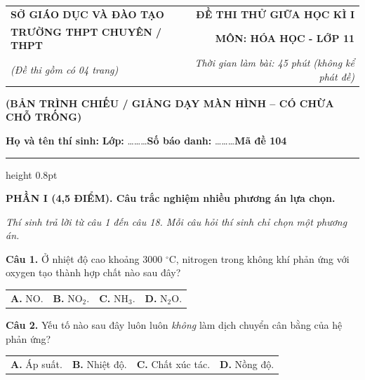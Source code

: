 \documentclass[13pt,a4paper]{article}
\begin{document}
\begin{tabularx}{\textwidth}{@{}l X r@{}}
\textbf{\small SỞ GIÁO DỤC VÀ ĐÀO TẠO} & & \textbf{\small ĐỀ THI THỬ GIỮA HỌC KÌ I} \\
\textbf{\normalsize TRƯỜNG THPT CHUYÊN / THPT} & & \textbf{\normalsize MÔN: HÓA HỌC - LỚP 11} \\
\textit{\small (Đề thi gồm có 04 trang)} & & \textit{\small Thời gian làm bài: 45 phút (không kể phát đề)}
\end{tabularx}

\begin{center}
{\color{purple!80!black}\textbf{(BẢN TRÌNH CHIẾU / GIẢNG DẠY MÀN HÌNH -- CÓ CHỪA CHỖ TRỐNG)}}\par\vspace{3pt}
\textbf{Họ và tên thí sinh:} \dotfill \quad \textbf{Lớp:} \dots\dots\dots \quad \textbf{Số báo danh:} \dots\dots\dots \hfill \textbf{\large Mã đề 104}
\end{center}
\vspace{-4pt}
{\color{gray!50}\hrule height 0.8pt}
\vspace{6pt}

{\color{myGreen}\bfseries\large PHẦN I (4,5 ĐIỂM). Câu trắc nghiệm nhiều phương án lựa chọn.}

\textit{\small Thí sinh trả lời từ câu 1 đến câu 18. Mỗi câu hỏi thí sinh chỉ chọn một phương án.}
\vspace{3pt}

\textbf{Câu 1.} Ở nhiệt độ cao khoảng 3000 $^\circ\text{C}$, nitrogen trong không khí phản ứng với oxygen tạo thành hợp chất nào sau đây?

\begin{tabularx}{\textwidth}{@{}XXXX@{}}
\textbf{A.} NO. & \textbf{B.} NO$_{2}$. & \textbf{C.} NH$_{3}$. & \textbf{D.} N$_{2}$O. \\
\end{tabularx}

\vspace{1.6cm}

\textbf{Câu 2.} Yếu tố nào sau đây luôn luôn \textit{không} làm dịch chuyển cân bằng của hệ phản ứng?

\begin{tabularx}{\textwidth}{@{}XXXX@{}}
\textbf{A.} Áp suất. & \textbf{B.} Nhiệt độ. & \textbf{C.} Chất xúc tác. & \textbf{D.} Nồng độ. \\
\end{tabularx}

\vspace{1.6cm}
\end{document}
